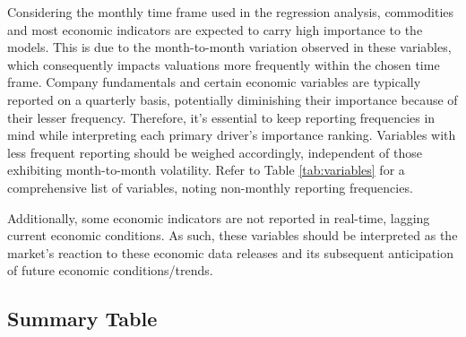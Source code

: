 \documentclass[12pt,a4paper,english]{article}
\begin{document}
Considering the monthly time frame used in the regression analysis, commodities and most economic indicators are expected to carry high importance to the models. This is due to the month-to-month variation observed in these variables, which consequently impacts valuations more frequently within the chosen time frame. Company fundamentals and certain economic variables are typically reported on a quarterly basis, potentially diminishing their importance because of their lesser frequency. Therefore, it's essential to keep reporting frequencies in mind while interpreting each primary driver's importance ranking. Variables with less frequent reporting should be weighed accordingly, independent of those exhibiting month-to-month volatility. Refer to Table \ref{tab:variables} for a comprehensive list of variables, noting non-monthly reporting frequencies.

Additionally, some economic indicators are not reported in real-time, lagging current economic conditions. As such, these variables should be interpreted as the market's reaction to these economic data releases and its subsequent anticipation of future economic conditions/trends.

\subsection{Summary Table}
\end{document}
